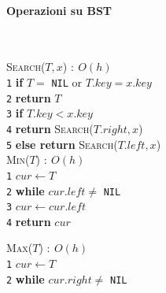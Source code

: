 \documentclass[10pt,landscape]{article}
\newcommand{\myparagraph}[1]{\paragraph{#1}\mbox{}\\ [5pt]}
\begin{document}
\begin{multicols*}{4}
\begin{multicols}{2}
                \end{multicols}
                \myparagraph{Operazioni su BST}
                \begin{multicols}{2}
                        \textsc{Search($T,x$)} $:\ O(h)$\\ [3pt]
                        \verb|1|\hspace*{0.5em} \textbf{if} $T=$ \verb|NIL| or $T.key=x.key$\\
                        \verb|2|\hspace*{1.5em} \textbf{return} $T$\\
                        \verb|3|\hspace*{0.5em} \textbf{if} $T.key<x.key$\\
                        \verb|4|\hspace*{1.5em} \textbf{return} \textsc{Search}($T.right,x$)\\
                        \verb|5|\hspace*{0.5em} \textbf{else return} \textsc{Search}($T.left,x$)\\
                        \columnbreak
                        \textsc{Min($T$)} $:\ O(h)$\\ [3pt]
                        \verb|1|\hspace*{0.5em} $cur \leftarrow T$\\
                        \verb|2|\hspace*{0.5em} \textbf{while} $cur.left \neq$ \verb|NIL|\\
                        \verb|3|\hspace*{1.5em} $cur \leftarrow cur.left$\\
                        \verb|4|\hspace*{0.5em} \textbf{return} $cur$\\
                \end{multicols}
                \begin{multicols}{2}
                        \textsc{Max($T$)} $:\ O(h)$\\ [3pt]
                        \verb|1|\hspace*{0.5em} $cur \leftarrow T$\\
                        \verb|2|\hspace*{0.5em} \textbf{while} $cur.right \neq$ \verb|NIL|\\

\end{multicols}
\end{multicols*}
\end{document}
